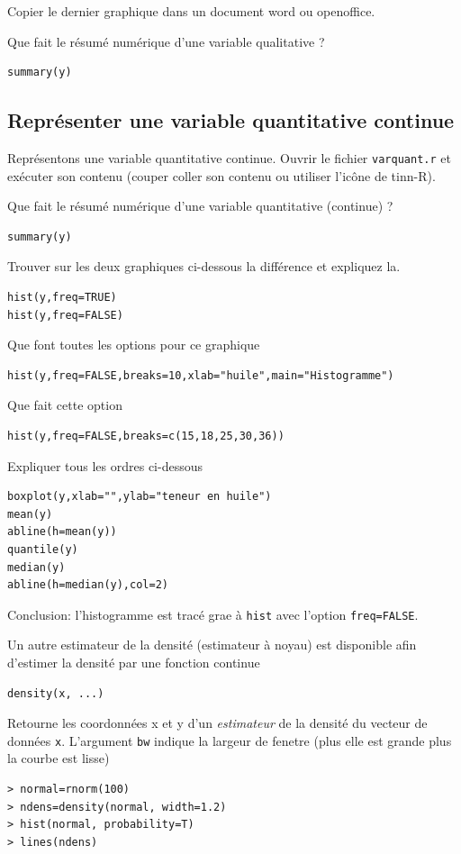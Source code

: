 \documentclass[a4paper,10pt,french]{article}
\newcommand{\code}[1]{\texttt{#1}}
\begin{document}
Copier le dernier graphique dans un document word ou openoffice.

Que fait le résumé numérique d'une variable qualitative ?
\begin{verbatim}
summary(y)
\end{verbatim}

\subsection{Représenter une variable quantitative continue}
Représentons une variable quantitative continue. Ouvrir le fichier
\texttt{varquant.r} et exécuter son contenu (couper coller son contenu
ou utiliser l'icône de tinn-R).


Que fait le résumé numérique d'une variable quantitative (continue) ?
\begin{verbatim}
summary(y)
\end{verbatim}
Trouver sur les deux graphiques ci-dessous la différence et expliquez la.
\begin{verbatim}
hist(y,freq=TRUE)
hist(y,freq=FALSE)
\end{verbatim}

Que font toutes les options pour ce graphique
\begin{verbatim}
hist(y,freq=FALSE,breaks=10,xlab="huile",main="Histogramme")
\end{verbatim}
Que fait cette option
\begin{verbatim}
hist(y,freq=FALSE,breaks=c(15,18,25,30,36))
\end{verbatim}
Expliquer tous les ordres ci-dessous
\begin{verbatim}
boxplot(y,xlab="",ylab="teneur en huile")
mean(y)
abline(h=mean(y))
quantile(y)
median(y)
abline(h=median(y),col=2)
\end{verbatim}
Conclusion: l'histogramme est tracé grae à \texttt{hist} avec l'option
\texttt{freq=FALSE}.

Un autre estimateur de la densité (estimateur à noyau) est disponible afin d'estimer la densité par une fonction continue
\begin{verbatim}
density(x, ...)
\end{verbatim}
Retourne les coordonnées x et y d'un \emph{estimateur} de la densité du vecteur de données \code{x}. L'argument \code{bw} indique la largeur de fenetre (plus elle est grande plus la courbe est lisse)
\begin{verbatim}
> normal=rnorm(100)
> ndens=density(normal, width=1.2)
> hist(normal, probability=T)
> lines(ndens)
\end{verbatim}
 
\end{document}
